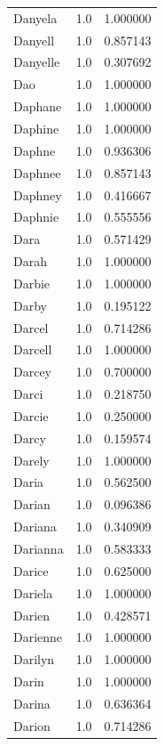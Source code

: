 \documentclass[
  letterpaper,
  DIV=11,
  numbers=noendperiod]{scrreprt}
\begin{document}
\begin{tabular}{lrr}
Danyela         &   1.0 &   1.000000 \\
Danyell         &   1.0 &   0.857143 \\
Danyelle        &   1.0 &   0.307692 \\
Dao             &   1.0 &   1.000000 \\
Daphane         &   1.0 &   1.000000 \\
Daphine         &   1.0 &   1.000000 \\
Daphne          &   1.0 &   0.936306 \\
Daphnee         &   1.0 &   0.857143 \\
Daphney         &   1.0 &   0.416667 \\
Daphnie         &   1.0 &   0.555556 \\
Dara            &   1.0 &   0.571429 \\
Darah           &   1.0 &   1.000000 \\
Darbie          &   1.0 &   1.000000 \\
Darby           &   1.0 &   0.195122 \\
Darcel          &   1.0 &   0.714286 \\
Darcell         &   1.0 &   1.000000 \\
Darcey          &   1.0 &   0.700000 \\
Darci           &   1.0 &   0.218750 \\
Darcie          &   1.0 &   0.250000 \\
Darcy           &   1.0 &   0.159574 \\
Darely          &   1.0 &   1.000000 \\
Daria           &   1.0 &   0.562500 \\
Darian          &   1.0 &   0.096386 \\
Dariana         &   1.0 &   0.340909 \\
Darianna        &   1.0 &   0.583333 \\
Darice          &   1.0 &   0.625000 \\
Dariela         &   1.0 &   1.000000 \\
Darien          &   1.0 &   0.428571 \\
Darienne        &   1.0 &   1.000000 \\
Darilyn         &   1.0 &   1.000000 \\
Darin           &   1.0 &   1.000000 \\
Darina          &   1.0 &   0.636364 \\
Darion          &   1.0 &   0.714286 \\

\end{tabular}
\end{document}
